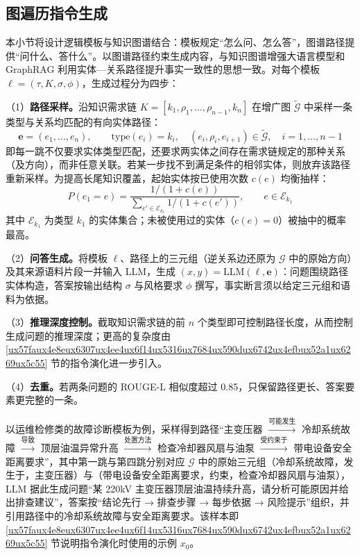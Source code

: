 \documentclass[fontset=fandol,type=master,campus=shenzhen,etitleauto=true]{hithesisbook}
\begin{document}
\subsection{图遍历指令生成}\label{ux903bux8f91ux6a21ux677fux9a71ux52a8ux7684ux56feux904dux5386ux751fux6210}

本小节将设计逻辑模板与知识图谱结合：模板规定“怎么问、怎么答”，图谱路径提供“问什么、答什么”。以图谱路径约束生成内容，与知识图谱增强大语言模型和 GraphRAG 利用实体—关系路径提升事实一致性的思想一致\cite{ref15,ref16}。对每个模板 $\ell = (\tau, K, \sigma, \phi)$，生成过程分为四步：

（1）\textbf{路径采样。}沿知识需求链 $K = [k_1, \rho_1, \ldots, \rho_{n-1}, k_n]$ 在增广图 $\tilde{\mathcal{G}}$ 中采样一条类型与关系均匹配的有向实体路径：
\begin{equation}\label{eq:path}
\mathbf{e} = (e_1, \ldots, e_n), \qquad \text{type}(e_i) = k_i, \quad (e_i, \rho_i, e_{i+1}) \in \tilde{\mathcal{G}}, \quad i = 1, \ldots, n-1
\end{equation}
即每一跳不仅要求实体类型匹配，还要求两实体之间存在需求链规定的那种关系（及方向），而非任意关联。若某一步找不到满足条件的相邻实体，则放弃该路径重新采样。为提高长尾知识覆盖，起始实体按已使用次数 $c(e)$ 均衡抽样：
\begin{equation}\label{eq:start-entity}
P(e_1 = e) = \frac{1 / (1 + c(e))}{\sum_{e' \in \mathcal{E}_{k_1}} 1 / (1 + c(e'))}, \qquad e \in \mathcal{E}_{k_1}
\end{equation}
其中 $\mathcal{E}_{k_1}$ 为类型 $k_1$ 的实体集合；未被使用过的实体（$c(e) = 0$）被抽中的概率最高。

（2）\textbf{问答生成。}将模板 $\ell$、路径上的三元组（逆关系边还原为 $\mathcal{G}$ 中的原始方向）及其来源语料片段一并输入 LLM，生成 $(x, y) = \text{LLM}(\ell, \mathbf{e})$：问题围绕路径实体构造，答案按输出结构 $\sigma$ 与风格要求 $\phi$ 撰写，事实断言须以给定三元组和语料为依据。

（3）\textbf{推理深度控制。}截取知识需求链的前 $n$ 个类型即可控制路径长度，从而控制生成问题的推理深度；更高的复杂度由 \ref{ux57faux4e8eux6307ux4ee4ux6f14ux5316ux7684ux590dux6742ux4efbux52a1ux6269ux5c55} 节的指令演化进一步引入。

（4）\textbf{去重。}若两条问题的 ROUGE-L 相似度\cite{ref75}超过 0.85，只保留路径更长、答案要素更完整的一条。

以运维检修类的故障诊断模板为例，采样得到路径“主变压器 $\xrightarrow{\text{可能发生}}$ 冷却系统故障 $\xrightarrow{\text{导致}}$ 顶层油温异常升高 $\xrightarrow{\text{处置方法}}$ 检查冷却器风扇与油泵 $\xrightarrow{\text{受约束于}}$ 带电设备安全距离要求”，其中第一跳与第四跳分别对应 $\mathcal{G}$ 中的原始三元组（冷却系统故障，发生于，主变压器）与（带电设备安全距离要求，约束，检查冷却器风扇与油泵），LLM 据此生成问题“某 220kV 主变压器顶层油温持续升高，请分析可能原因并给出排查建议”，答案按“结论先行 → 排查步骤 → 每步依据 → 风险提示”组织，并引用路径中的冷却系统故障与安全距离要求。该样本即 \ref{ux57faux4e8eux6307ux4ee4ux6f14ux5316ux7684ux590dux6742ux4efbux52a1ux6269ux5c55} 节说明指令演化时使用的示例 $x_0$。
\end{document}
